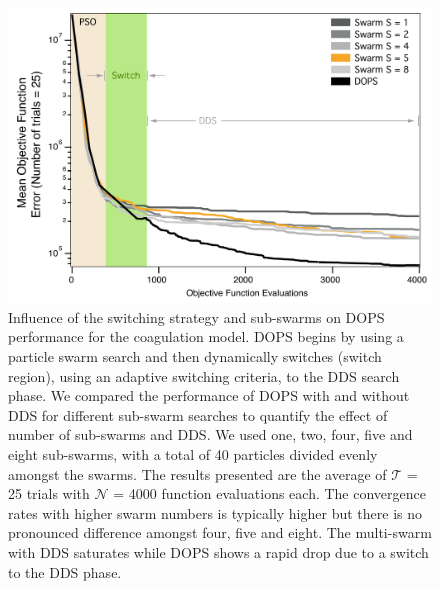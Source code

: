 \documentclass[12pt]{article}
\begin{document}
\begin{figure}[h]
\centering
\includegraphics[width=1.0\textwidth]{./figs/Figure_7_ErrorSwarms_v2.pdf}
\caption{Influence of the switching strategy and sub-swarms on DOPS performance for the coagulation model.
DOPS begins by using a particle swarm search and then dynamically switches (switch region), using an adaptive switching criteria, to the DDS search phase.
We compared the performance of DOPS with and without DDS for different sub-swarm searches to quantify the effect of number of sub-swarms and DDS.
We used one, two, four, five and eight sub-swarms, with a total of 40 particles divided evenly amongst the swarms.
The results presented are the average of $\mathcal{T}$ = 25 trials with $\mathcal{N}$ = 4000 function evaluations each.
The convergence rates with higher swarm numbers is typically higher but there is no pronounced difference amongst four, five and eight.
The multi-swarm with DDS saturates while DOPS shows a rapid drop due to a switch to the DDS phase.
}\label{fig-sub-swarms}
\end{figure}





\clearpage
\end{document}
